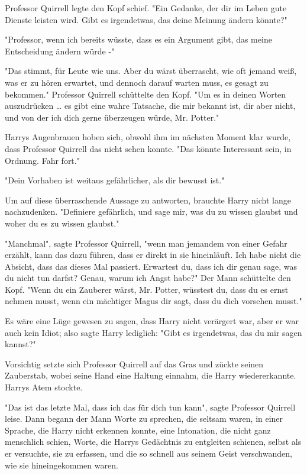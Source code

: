 {Professor Quirrell legte den Kopf schief. "Ein Gedanke, der dir im Leben gute Dienste leisten wird. Gibt es irgendetwas, das deine Meinung ändern könnte?"

"Professor, wenn ich bereits wüsste, dass es ein Argument gibt, das meine Entscheidung ändern würde -"

"Das stimmt, für Leute wie uns. Aber du wärst überrascht, wie oft jemand weiß, was er zu hören erwartet, und dennoch darauf warten muss, es gesagt zu bekommen." Professor Quirrell schüttelte den Kopf. "Um es in deinen Worten auszudrücken … es gibt eine wahre Tatsache, die mir bekannt ist, dir aber nicht, und von der ich dich gerne überzeugen würde, Mr. Potter."

Harrys Augenbrauen hoben sich, obwohl ihm im nächsten Moment klar wurde, dass Professor Quirrell das nicht sehen konnte. "Das könnte Interessant sein, in Ordnung. Fahr fort."

"Dein Vorhaben ist weitaus gefährlicher, als dir bewusst ist."

Um auf diese überraschende Aussage zu antworten, brauchte Harry nicht lange nachzudenken. "Definiere gefährlich, und sage mir, was du zu wissen glaubst und woher du es zu wissen glaubst."

"Manchmal", sagte Professor Quirrell, "wenn man jemandem von einer Gefahr erzählt, kann das dazu führen, dass er direkt in sie hineinläuft. Ich habe nicht die Absicht, dass das dieses Mal passiert. Erwartest du, dass ich dir genau sage, was du nicht tun darfst? Genau, warum ich Angst habe?" Der Mann schüttelte den Kopf. "Wenn du ein Zauberer wärst, Mr. Potter, wüsstest du, dass du es ernst nehmen musst, wenn ein mächtiger Magus dir sagt, dass du dich vorsehen musst."

Es wäre eine Lüge gewesen zu sagen, dass Harry nicht verärgert war, aber er war auch kein Idiot; also sagte Harry lediglich: "Gibt es irgendetwas, das du mir sagen kannst?"

Vorsichtig setzte sich Professor Quirrell auf das Gras und zückte seinen Zauberstab, wobei seine Hand eine Haltung einnahm, die Harry wiedererkannte. Harrys Atem stockte.

"Das ist das letzte Mal, dass ich das für dich tun kann", sagte Professor Quirrell leise. Dann begann der Mann Worte zu sprechen, die seltsam waren, in einer Sprache, die Harry nicht erkennen konnte, eine Intonation, die nicht ganz menschlich schien, Worte, die Harrys Gedächtnis zu entgleiten schienen, selbst als er versuchte, sie zu erfassen, und die so schnell aus seinem Geist verschwanden, wie sie hineingekommen waren.

}
